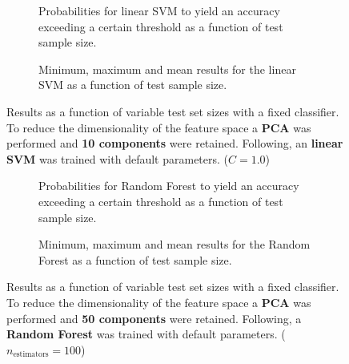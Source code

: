 \begin{figure}
    \captionsetup[subfigure]{justification=justified,singlelinecheck=false}
    \begin{subfigure}[t]{0.61\textwidth}
        
        \caption{Probabilities for linear SVM to yield an accuracy exceeding a certain threshold as a function of test sample size.}
    \end{subfigure}
    \hspace{3.0mm}
    \begin{subfigure}[t]{0.34\textwidth}
        
        \caption{Minimum, maximum and mean results for the linear SVM as a function of test sample size.}
    \end{subfigure}
    \caption[Effects of varying test sample size. Linear SVM; Preprocessing: PCA ($n_\text{components} = \num{10}$)]{Results as a function of variable test set sizes with a fixed classifier. To reduce the dimensionality of the feature space a \textbf{PCA} was performed and \textbf{\num{10} components} were retained. Following, an \textbf{{linear SVM}} was trained with default parameters. ($C=\num{1.0}$)}
    \label{fig:PCA_10_components_no_selection_LinearSVC}
\end{figure}

\begin{figure}
    \captionsetup[subfigure]{justification=justified,singlelinecheck=false}
    \begin{subfigure}[t]{0.61\textwidth}
        
        \caption{Probabilities for Random Forest to yield an accuracy exceeding a certain threshold as a function of test sample size.}
    \end{subfigure}
    \hspace{3.0mm}
    \begin{subfigure}[t]{0.34\textwidth}
        
        \caption{Minimum, maximum and mean results for the Random Forest as a function of test sample size.}
    \end{subfigure}
    \caption[Effects of varying test sample size. Random Forest; Preprocessing: PCA ($n_\text{components} = \num{50}$)]{Results as a function of variable test set sizes with a fixed classifier. To reduce the dimensionality of the feature space a \textbf{PCA} was performed and \textbf{\num{50} components} were retained. Following, a \textbf{{Random Forest}} was trained with default parameters. ($n_\text{estimators}=\num{100}$)}
    \label{fig:PCA_50_components_no_selection_RandomForest}
\end{figure}

